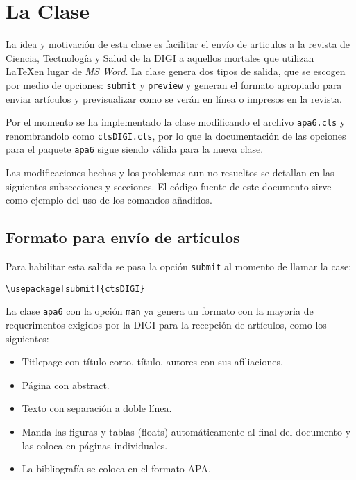 \documentclass[preview]{ctsDIGI}
\author{L.García, H. Pérez*}
\affiliation{Escuela de ciencias Físicas y Matemáticas, Universidad de San Carlos de Guatemala, Guatemala}
\begin{document}
\maketitle





\section{La Clase}
La idea y motivación de esta clase es facilitar el envío de articulos a la revista de Ciencia, Tectnología y Salud de la DIGI a aquellos mortales que utilizan \LaTeX en lugar de \emph{MS Word}. La clase genera dos tipos de salida, que se escogen por medio de opciones: \texttt{submit} y \texttt{preview} y generan el formato apropiado para enviar artículos y previsualizar como se verán en línea o impresos en la revista.

Por el momento se ha implementado la clase modificando el archivo \texttt{apa6.cls} y renombrandolo como \texttt{ctsDIGI.cls}, por lo que la documentación de las opciones para el paquete \texttt{apa6} sigue siendo válida para la nueva clase.

Las modificaciones hechas y los problemas aun no resueltos se detallan en las siguientes subsecciones y secciones. El código fuente de este documento sirve como ejemplo del uso de los comandos añadidos.

\subsection{Formato para envío de artículos}
Para habilitar esta salida se pasa la opción \texttt{submit} al momento de llamar la case:
\begin{verbatim}
\usepackage[submit]{ctsDIGI}
\end{verbatim}

La clase \texttt{apa6} con la opción \texttt{man} ya genera un formato con la mayoria de requerimentos exigidos por la DIGI para la recepción de artículos, como los siguientes:
\begin{itemize}
\item Titlepage con título corto, título, autores con sus afiliaciones.
\item Página con abstract.
\item Texto con separación a doble línea.
\item Manda las figuras y tablas (floats) automáticamente al final del documento y las coloca en páginas individuales.
\item La bibliografía se coloca en el formato APA.
\end{itemize}
\end{document}
